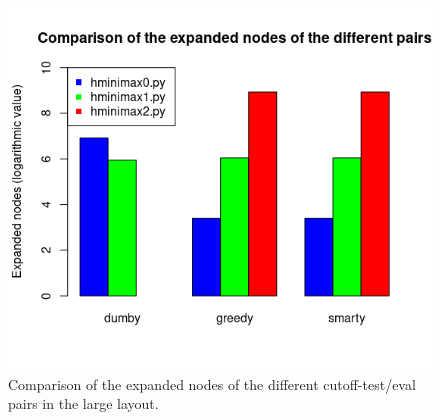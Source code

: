 \documentclass{article}
\begin{document}
		\begin{figure}[H]
			\centering
			\includegraphics[scale=0.75]{plots/3a_nodes.png} 
			\caption{Comparison of the expanded nodes of the different cutoff-test/eval pairs in the large layout.}
		\end{figure}
\end{document}
